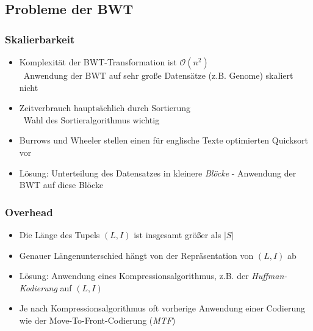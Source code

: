 \documentclass[14pt,xcolor=dvipsnames,pdftex]{beamer}
\begin{document}
\subsection{Probleme der BWT}
\begin{frame}
 \frametitle{Skalierbarkeit}
 \begin{itemize}
  \item Komplexität der BWT-Transformation ist $\mathcal{O}(n^2)$\\
    \textrightarrow \ Anwendung der BWT auf sehr große Datensätze (z.B. Genome) skaliert nicht
  \item Zeitverbrauch hauptsächlich durch Sortierung\\
  \textrightarrow\ Wahl des Sortieralgorithmus wichtig
  \item Burrows und Wheeler stellen einen für englische Texte optimierten Quicksort vor
  \item Lösung: Unterteilung des Datensatzes in kleinere \textit{Blöcke} - Anwendung der BWT auf diese Blöcke
 \end{itemize}
\end{frame}
\begin{frame}
 \frametitle{Overhead}
 \begin{itemize}
  \item Die Länge des Tupels $(L,I)$ ist insgesamt größer als $|S|$
  \item Genauer Längenunterschied hängt von der Repräsentation von $(L,I)$ ab
  \item Lösung: Anwendung eines Kompressionsalgorithmus, z.B. der \textit{Huffman-Kodierung} auf $(L,I)$
  \item Je nach Kompressionsalgorithmus oft vorherige Anwendung einer Codierung wie der Move-To-Front-Codierung (\textit{MTF})
  \end{itemize}
\end{frame}
\end{document}
